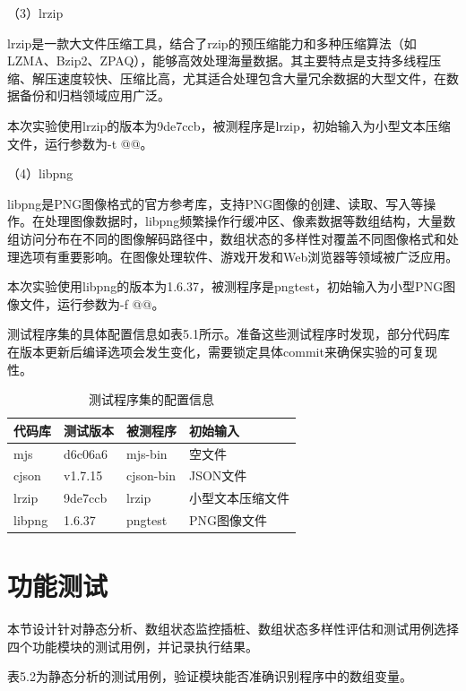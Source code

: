 \documentclass[bachelor]{njupthesis}
\begin{document}
（3）lrzip

lrzip是一款大文件压缩工具，结合了rzip的预压缩能力和多种压缩算法（如LZMA、Bzip2、ZPAQ），能够高效处理海量数据。其主要特点是支持多线程压缩、解压速度较快、压缩比高，尤其适合处理包含大量冗余数据的大型文件，在数据备份和归档领域应用广泛。

本次实验使用lrzip的版本为9de7ccb，被测程序是lrzip，初始输入为小型文本压缩文件，运行参数为-t @@。

（4）libpng

libpng是PNG图像格式的官方参考库，支持PNG图像的创建、读取、写入等操作。在处理图像数据时，libpng频繁操作行缓冲区、像素数据等数组结构，大量数组访问分布在不同的图像解码路径中，数组状态的多样性对覆盖不同图像格式和处理选项有重要影响。在图像处理软件、游戏开发和Web浏览器等领域被广泛应用。

本次实验使用libpng的版本为1.6.37，被测程序是pngtest，初始输入为小型PNG图像文件，运行参数为-f @@。

测试程序集的具体配置信息如表5.1所示。准备这些测试程序时发现，部分代码库在版本更新后编译选项会发生变化，需要锁定具体commit来确保实验的可复现性。

\begin{table}[hbt]
\centering
\caption{测试程序集的配置信息}
\label{tab:targets}
\begin{tabular}{llll}
\toprule
\textbf{代码库} & \textbf{测试版本} & \textbf{被测程序} & \textbf{初始输入} \\
\midrule
mjs & d6c06a6 & mjs-bin & 空文件 \\
cjson & v1.7.15 & cjson-bin & JSON文件 \\
lrzip & 9de7ccb & lrzip & 小型文本压缩文件 \\
libpng & 1.6.37 & pngtest & PNG图像文件 \\
\bottomrule
\end{tabular}
\end{table}

\section{功能测试}

本节设计针对静态分析、数组状态监控插桩、数组状态多样性评估和测试用例选择四个功能模块的测试用例，并记录执行结果。

表5.2为静态分析的测试用例，验证模块能否准确识别程序中的数组变量。
\end{document}
